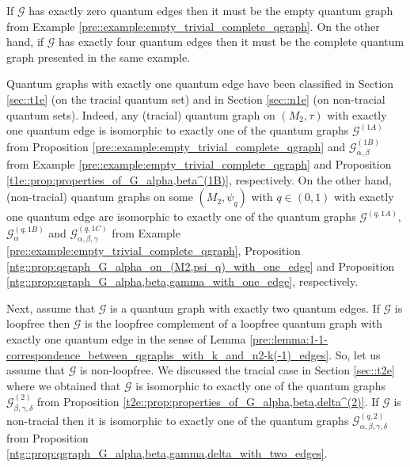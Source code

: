 \documentclass{amsart}
\begin{document}
If $\mathcal{G}$ has exactly zero quantum edges then it must be the empty quantum graph from Example \ref{pre::example:empty_trivial_complete_qgraph}. On the other hand, if $\mathcal{G}$ has exactly four quantum edges then it must be the complete quantum graph presented in the same example.

Quantum graphs with exactly one quantum edge have been classified in Section \ref{sec::t1e} (on the tracial quantum set) and in Section \ref{sec::n1e} (on non-tracial quantum sets). Indeed, any (tracial) quantum graph on $(M_2, \tau)$ with exactly one quantum edge is isomorphic to exactly one of the quantum graphs $\mathcal{G}^{(1A)}$ from Proposition \ref{pre::example:empty_trivial_complete_qgraph} and $\mathcal{G}_{\alpha,\beta}^{(1B)}$ from Example \ref{pre::example:empty_trivial_complete_qgraph} and Proposition \ref{t1e::prop:properties_of_G_alpha,beta^(1B)}, respectively. 
On the other hand, (non-tracial) quantum graphs on some $(M_2, \psi_q)$ with $q \in (0,1)$ with exactly one quantum edge are isomorphic to exactly one of the quantum graphs $\mathcal{G}^{(q,1A)}$, $\mathcal{G}_{\alpha}^{(q,1B)}$ and $\mathcal{G}_{\alpha,\beta,\gamma}^{(q,1C)}$ from Example \ref{pre::example:empty_trivial_complete_qgraph}, Proposition \ref{ntg::prop:qgraph_G_alpha_on_(M2,psi_q)_with_one_edge} and Proposition \ref{ntg::prop:qgraph_G_alpha,beta,gamma_with_one_edge}, respectively.



Next, assume that $\mathcal{G}$ is a quantum graph with exactly two quantum edges. If $\mathcal{G}$ is loopfree then $\mathcal{G}$ is the loopfree complement of a loopfree quantum graph with exactly one quantum edge in the sense of Lemma \ref{pre::lemma:1-1-correspondence_between_qgraphs_with_k_and_n2-k(-1)_edges}. 
So, let us assume that $\mathcal{G}$ is non-loopfree. 
We discussed the tracial case in Section \ref{sec::t2e} where we obtained that $\mathcal{G}$ is isomorphic to exactly one of the quantum graphs $\mathcal{G}_{\beta,\gamma,\delta}^{(2)}$ from Proposition \ref{t2e::prop:properties_of_G_alpha,beta,delta^(2)}. If $\mathcal{G}$ is non-tracial then it is isomorphic to exactly one of the quantum graphs $\mathcal{G}_{\alpha,\beta,\gamma,\delta}^{(q,2)}$ from Proposition \ref{ntg::prop:qgraph_G_alpha,beta,gamma,delta_with_two_edges}.
\end{document}

